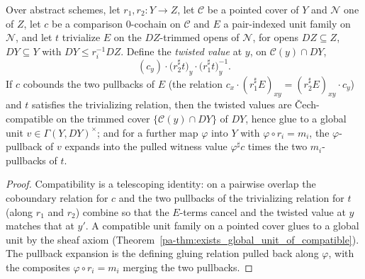 \begin{theorem}
  \label{pa-thm:exists_glued_unitsTrivTwist}
  \leanok

  Over abstract schemes, let \(r_1, r_2 \colon Y \to Z\), let \(\mathcal C\) be a pointed cover of
  \(Y\) and \(\mathcal N\) one of \(Z\), let \(c\) be a comparison \(0\)-cochain on \(\mathcal C\)
  and \(E\) a pair-indexed unit family on \(\mathcal N\), and let \(t\) trivialize \(E\) on the
  \(DZ\)-trimmed opens of \(\mathcal N\), for opens \(DZ \subseteq Z\), \(DY \subseteq Y\) with
  \(DY \le r_i^{-1}DZ\). Define the \emph{twisted value} at \(y\), on \(\mathcal C(y) \cap DY\),
  \[
    (c_y) \cdot \bigl(r_2^{\sharp}t\bigr)_y \cdot \bigl(r_1^{\sharp}t\bigr)_y^{-1} .
  \]
  If \(c\) cobounds the two pullbacks of \(E\) (the relation \(c_x \cdot (r_1^{\sharp}E)_{xy} =
  (r_2^{\sharp}E)_{xy} \cdot c_y\)) and \(t\) satisfies the trivializing relation, then the twisted
  values are \v Cech-compatible on the trimmed cover \(\{\mathcal C(y) \cap DY\}\) of \(DY\), hence
  glue to a global unit \(v \in \Gamma(Y, DY)^{\times}\); and for a further map \(\varphi\) into
  \(Y\) with \(\varphi \circ r_i = m_i\), the \(\varphi\)-pullback of \(v\) expands into the pulled
  witness value \(\varphi^{\sharp}c\) times the two \(m_i\)-pullbacks of \(t\).
\end{theorem}
\begin{proof}
  \leanok
  Compatibility is a telescoping identity: on a pairwise overlap the coboundary relation for \(c\)
  and the two pullbacks of the trivializing relation for \(t\) (along \(r_1\) and \(r_2\)) combine so
  that the \(E\)-terms cancel and the twisted value at \(y\) matches that at \(y'\). A compatible
  unit family on a pointed cover glues to a global unit by the sheaf axiom
  (Theorem~\ref{pa-thm:exists_global_unit_of_compatible}). The pullback expansion is the defining
  gluing relation pulled back along \(\varphi\), with the composites \(\varphi \circ r_i = m_i\)
  merging the two pullbacks.
\end{proof}

